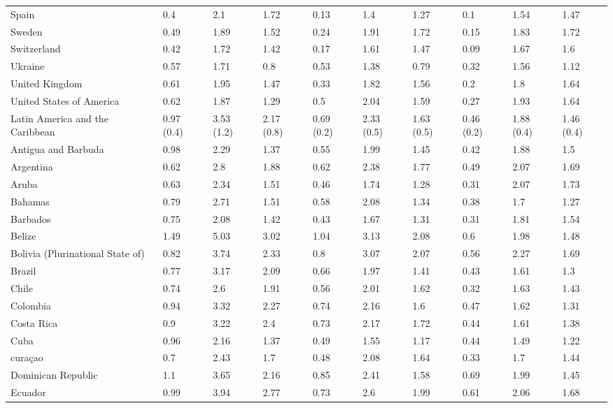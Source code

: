\begin{longtable}[t]{llllllllll}
\addlinespace
Spain & 0.4 & 2.1 & 1.72 & 0.13 & 1.4 & 1.27 & 0.1 & 1.54 & 1.47\\
Sweden & 0.49 & 1.89 & 1.52 & 0.24 & 1.91 & 1.72 & 0.15 & 1.83 & 1.72\\
Switzerland & 0.42 & 1.72 & 1.42 & 0.17 & 1.61 & 1.47 & 0.09 & 1.67 & 1.6\\
Ukraine & 0.57 & 1.71 & 0.8 & 0.53 & 1.38 & 0.79 & 0.32 & 1.56 & 1.12\\
United Kingdom & 0.61 & 1.95 & 1.47 & 0.33 & 1.82 & 1.56 & 0.2 & 1.8 & 1.64\\
\addlinespace
United States of America & 0.62 & 1.87 & 1.29 & 0.5 & 2.04 & 1.59 & 0.27 & 1.93 & 1.64\\
Latin America and the Caribbean & 0.97 (0.4) & 3.53 (1.2) & 2.17 (0.8) & 0.69 (0.2) & 2.33 (0.5) & 1.63 (0.5) & 0.46 (0.2) & 1.88 (0.4) & 1.46 (0.4)\\
Antigua and Barbuda & 0.98 & 2.29 & 1.37 & 0.55 & 1.99 & 1.45 & 0.42 & 1.88 & 1.5\\
Argentina & 0.62 & 2.8 & 1.88 & 0.62 & 2.38 & 1.77 & 0.49 & 2.07 & 1.69\\
Aruba & 0.63 & 2.34 & 1.51 & 0.46 & 1.74 & 1.28 & 0.31 & 2.07 & 1.73\\
\addlinespace
Bahamas & 0.79 & 2.71 & 1.51 & 0.58 & 2.08 & 1.34 & 0.38 & 1.7 & 1.27\\
Barbados & 0.75 & 2.08 & 1.42 & 0.43 & 1.67 & 1.31 & 0.31 & 1.81 & 1.54\\
Belize & 1.49 & 5.03 & 3.02 & 1.04 & 3.13 & 2.08 & 0.6 & 1.98 & 1.48\\
Bolivia (Plurinational State of) & 0.82 & 3.74 & 2.33 & 0.8 & 3.07 & 2.07 & 0.56 & 2.27 & 1.69\\
Brazil & 0.77 & 3.17 & 2.09 & 0.66 & 1.97 & 1.41 & 0.43 & 1.61 & 1.3\\
\addlinespace
Chile & 0.74 & 2.6 & 1.91 & 0.56 & 2.01 & 1.62 & 0.32 & 1.63 & 1.43\\
Colombia & 0.94 & 3.32 & 2.27 & 0.74 & 2.16 & 1.6 & 0.47 & 1.62 & 1.31\\
Costa Rica & 0.9 & 3.22 & 2.4 & 0.73 & 2.17 & 1.72 & 0.44 & 1.61 & 1.38\\
Cuba & 0.96 & 2.16 & 1.37 & 0.49 & 1.55 & 1.17 & 0.44 & 1.49 & 1.22\\
curaçao & 0.7 & 2.43 & 1.7 & 0.48 & 2.08 & 1.64 & 0.33 & 1.7 & 1.44\\
\addlinespace
Dominican Republic & 1.1 & 3.65 & 2.16 & 0.85 & 2.41 & 1.58 & 0.69 & 1.99 & 1.45\\
Ecuador & 0.99 & 3.94 & 2.77 & 0.73 & 2.6 & 1.99 & 0.61 & 2.06 & 1.68\\

\end{longtable}
